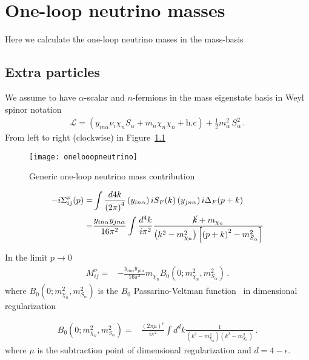 \chapter{One-loop neutrino masses}
Here we calculate the one-loop neutrino mases in the mass-basis


\section{Extra particles}
We assume to have $\alpha$-scalar  and $n$-fermions in the mass eigenstate basis in Weyl spinor notation
\begin{align}
  \mathcal{L}=\left(y_{in\alpha}\nu_{i}\chi_n S_{\alpha}+m_n \chi_n\chi_n +\text{h.c} \right)+\tfrac{1}{2}m_{\alpha}^2\,S_{\alpha}^2\,.
\end{align}
From left to right (clockwise) in Figure~\ref{fig:1lnu}
\begin{figure}
  \centering
  \texttt{[image: onelooopneutrino]}
  \caption{Generic one-loop neutrino mass contribution}
  \label{fig:1lnu}
\end{figure}

\begin{align}
-i\Sigma^{\nu}_{ij}(p)=&\int \frac{d4k}{\left( 2\pi \right)^{4}}\left(y_{in\alpha}  \right)iS_F(k) \left(y_{jn\alpha}\right)i\Delta_F(p+k) \nonumber\\
=&\frac{y_{i n\alpha}y_{j n\alpha}}{16\pi^2}\int \frac{d^4k}{i\pi^2}\frac{\cancel{k}+m_{\chi_n}}{\left(k^2-m_{\chi_n}^2  \right)\left[\left(p+k\right)^2-m_{S_\alpha}^2\right]}
\end{align}

In the limit $p\to 0$
\begin{align}
\label{eq:mnub0}
   M^{\nu}_{ij}=&-\frac{y_{i n\alpha}y_{j n\alpha}}{16\pi^2}m_{\chi_n} B_0 \left( 0;m_{\chi_n}^2,m_{S_{\alpha}}^2 \right) \,.
\end{align}
where $B_0\left
(0;m_{\chi_n}^2,m^2_{S_{\alpha}} \right)$ is the $B_0$ Passarino-Veltman function~\cite{Passarino:1978jh} in dimensional regularization 

\begin{align}
  \label{eq:mnueigi02}
  B_0 \left(0;m_{\chi_n}^2,m^2_{S_{\alpha}} \right)=&\frac{\left( 2\pi \mu \right)^{\epsilon}}{i\pi^2}\int d^dk\frac{1}{\left(k^2-m_{\chi_n}^2\right)\left(k^2-m_{S_\alpha}^2\right)}\,.
\end{align}
where $\mu$ is the subtraction point of dimensional regularization and $d=4-\epsilon$.

